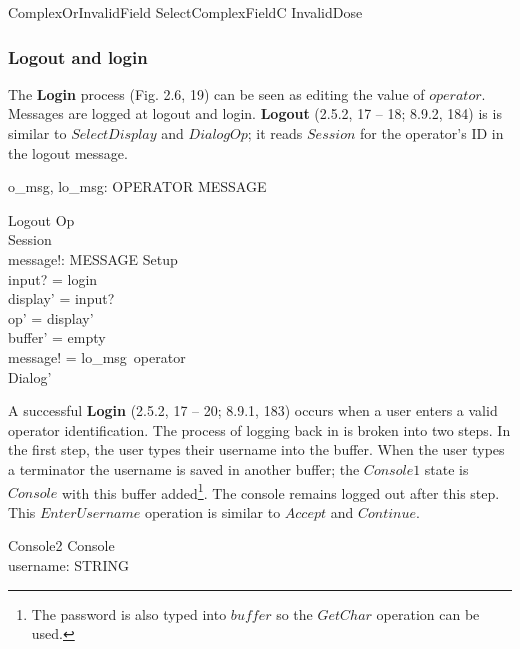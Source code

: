 \documentclass{article}
\begin{document}
\begin{zed}
ComplexOrInvalidField  SelectComplexFieldC \lor InvalidDose
\end{zed}

\subsubsection{Logout and login} \label{sect:login-console}

The {\bf Login} process (Fig. 2.6, 19) can be seen as editing the
value of $operator$.  Messages are logged at logout and login.  
{\bf Logout} (2.5.2, 17 -- 18; 8.9.2, 184) is is similar to $SelectDisplay$
and $DialogOp$; it reads $Session$ for the operator's ID in the logout
message. 

\begin{axdef}
	o\_msg, lo\_msg: OPERATOR \fun MESSAGE
\end{axdef}

\begin{schema}{Logout}
	Op \\
	\Xi Session \\
	message!: MESSAGE
\where
	Setup \\
	input? = login \\
	display' = input? \\
	op' =  display' \\
	buffer' = empty \\
	message! = lo\_msg~operator \\
	Dialog' 
\end{schema}
A successful {\bf Login} (2.5.2, 17 -- 20; 8.9.1, 183) occurs when a
user enters a valid operator identification.  The process of logging
back in is broken into two steps.  In the first step, the user types
their username into the buffer.  When the user types a terminator the
username is saved in another buffer; the $Console1$ state is $Console$
with this buffer added\footnote{The password is also typed into
$buffer$ so the $GetChar$ operation can be used.}. The console remains
logged out after this step.  This $EnterUsername$ operation is similar
to $Accept$ and $Continue$.

\begin{schema}{Console2}
	Console \\
	username: STRING
\end{schema}
\end{document}
